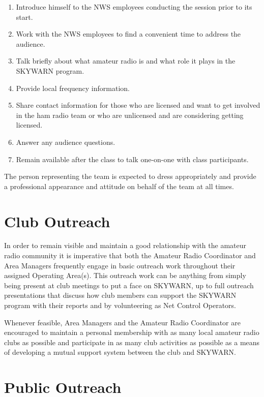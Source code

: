 \documentclass[pdflatex,letterpaper,twoside,12pt]{book}
\begin{document}
\begin{enumerate} 
\item Introduce himself to the NWS employees conducting the session prior to its start.
\item Work with the NWS employees to find a convenient time to address the audience.
\item Talk briefly about what amateur radio is and what role it plays in the SKYWARN program.
\item Provide local frequency information.
\item Share contact information for those who are licensed and want to get involved in the ham radio team or who are unlicensed and are considering getting licensed.
\item Answer any audience questions.
\item Remain available after the class to talk one-on-one with class participants.
\end{enumerate}

The person representing the team is expected to dress appropriately and provide a professional appearance and attitude on behalf of the team at all times.


\section{Club Outreach}

In order to remain visible and maintain a good relationship with the amateur radio community it is imperative that both the Amateur Radio Coordinator and Area Managers frequently engage in basic outreach work throughout their assigned Operating Area(s).  This outreach work can be anything from simply being present at club meetings to put a face on SKYWARN, up to full outreach presentations that discuss how club members can support the SKYWARN program with their reports and by volunteering as Net Control Operators.

Whenever feasible, Area Managers and the Amateur Radio Coordinator are encouraged to maintain a personal membership with as many local amateur radio clubs as possible and participate in as many club activities as possible as a means of developing a mutual support system between the club and SKYWARN.


\section{Public Outreach}
\end{document}
